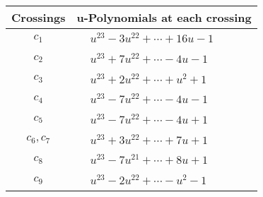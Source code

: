 \documentclass[1p]{elsarticle_modified}
\theoremstyle{definition}
\begin{document}
\begin{tabular}{m{50pt}|m{274pt}}
Crossings & \hspace{64pt}u-Polynomials at each crossing \\
\hline $$\begin{aligned}c_{1}\end{aligned}$$&$\begin{aligned}
&u^{23}-3 u^{22}+\cdots+16 u-1
\end{aligned}$\\
\hline $$\begin{aligned}c_{2}\end{aligned}$$&$\begin{aligned}
&u^{23}+7 u^{22}+\cdots-4 u-1
\end{aligned}$\\
\hline $$\begin{aligned}c_{3}\end{aligned}$$&$\begin{aligned}
&u^{23}+2 u^{22}+\cdots+u^2+1
\end{aligned}$\\
\hline $$\begin{aligned}c_{4}\end{aligned}$$&$\begin{aligned}
&u^{23}-7 u^{22}+\cdots-4 u-1
\end{aligned}$\\
\hline $$\begin{aligned}c_{5}\end{aligned}$$&$\begin{aligned}
&u^{23}-7 u^{22}+\cdots-4 u+1
\end{aligned}$\\
\hline $$\begin{aligned}c_{6},c_{7}\end{aligned}$$&$\begin{aligned}
&u^{23}+3 u^{22}+\cdots+7 u+1
\end{aligned}$\\
\hline $$\begin{aligned}c_{8}\end{aligned}$$&$\begin{aligned}
&u^{23}-7 u^{21}+\cdots+8 u+1
\end{aligned}$\\
\hline $$\begin{aligned}c_{9}\end{aligned}$$&$\begin{aligned}
&u^{23}-2 u^{22}+\cdots- u^2-1
\end{aligned}$\\

\end{tabular}
\end{document}
